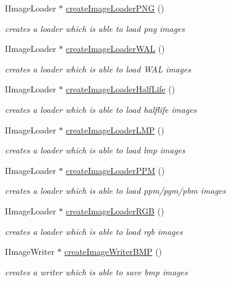 \begin{DoxyCompactItemize}
I\-Image\-Loader $\ast$ \hyperlink{namespaceirr_1_1video_a44e6931ab8ad0169d41816ed64f3a647}{create\-Image\-Loader\-P\-N\-G} ()
\begin{DoxyCompactList}\small\item\em creates a loader which is able to load png images \end{DoxyCompactList}\item 
I\-Image\-Loader $\ast$ \hyperlink{namespaceirr_1_1video_aba02d3dc8d766c4e19e2c77c7e60268d}{create\-Image\-Loader\-W\-A\-L} ()
\begin{DoxyCompactList}\small\item\em creates a loader which is able to load W\-A\-L images \end{DoxyCompactList}\item 
I\-Image\-Loader $\ast$ \hyperlink{namespaceirr_1_1video_acc5a5a7c745e2e72bffb97052420f525}{create\-Image\-Loader\-Half\-Life} ()
\begin{DoxyCompactList}\small\item\em creates a loader which is able to load halflife images \end{DoxyCompactList}\item 
I\-Image\-Loader $\ast$ \hyperlink{namespaceirr_1_1video_a902b8dc1273ce0f20323b437ed1b84ab}{create\-Image\-Loader\-L\-M\-P} ()
\begin{DoxyCompactList}\small\item\em creates a loader which is able to load lmp images \end{DoxyCompactList}\item 
I\-Image\-Loader $\ast$ \hyperlink{namespaceirr_1_1video_af60fba78ac1893c629680dec5c9f57be}{create\-Image\-Loader\-P\-P\-M} ()
\begin{DoxyCompactList}\small\item\em creates a loader which is able to load ppm/pgm/pbm images \end{DoxyCompactList}\item 
I\-Image\-Loader $\ast$ \hyperlink{namespaceirr_1_1video_a0ba8266e5b41a77b803e2c45233222ee}{create\-Image\-Loader\-R\-G\-B} ()
\begin{DoxyCompactList}\small\item\em creates a loader which is able to load rgb images \end{DoxyCompactList}\item 
I\-Image\-Writer $\ast$ \hyperlink{namespaceirr_1_1video_adcdcce20a9ba10b08c03cce0677fef1b}{create\-Image\-Writer\-B\-M\-P} ()
\begin{DoxyCompactList}\small\item\em creates a writer which is able to save bmp images \end{DoxyCompactList}\item 

\end{DoxyCompactItemize}
